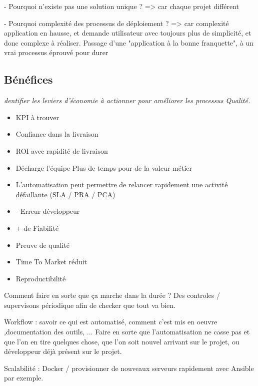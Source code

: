 
- Pourquoi n'existe pas une solution unique ? => car chaque projet différent 

- Pourquoi complexité des processus de déploiement ? => car complexité application en hausse, et demande utilisateur avec toujours plus de simplicité, et donc complexe à réaliser. Passage d'une "application à la bonne franquette", à un vrai processus éprouvé pour durer

\subsection{Bénéfices}


\textit{dentifier les leviers d’économie à actionner pour améliorer les processus Qualité.}

\begin{itemize}
	\item KPI à trouver
	\item Confiance dans la livraison
	\item ROI avec rapidité de livraison
	\item Décharge l'équipe
	\subitem Plus de temps pour de la valeur métier
	\item L'automatisation peut permettre de relancer rapidement une activité défaillante (SLA / PRA / PCA)
\end{itemize}

\begin{itemize}
	\item - Erreur développeur
	\item + de Fiabilité
	\item Preuve de qualité
	\item Time To Market réduit
	\item Reproductibilité
\end{itemize}

Comment faire en sorte que ça marche dans la durée ? Des controles / supervisons périodique afin de checker que tout va bien.

Workflow : savoir ce qui est automatisé, comment c'est mis en oeuvre ,documentation des outils, ...
Faire en sorte que l'automatisation ne casse pas et que l'on en tire quelques chose, que l'on soit nouvel arrivant sur le projet, ou développeur déjà présent sur le projet.

Scalabilité : Docker / provisionner de nouveaux serveurs rapidement avec Ansible par exemple.

